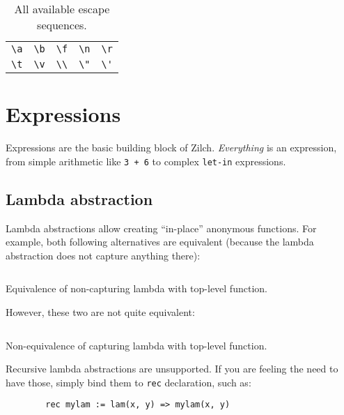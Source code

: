 \begin{table}[H]
	\begin{tabularx}{\textwidth}{*{5}{Y}}
		\toprule
		\verb|\a| & \verb|\b| & \verb|\f| & \verb|\n| & \verb|\r| \\
		\verb|\t| & \verb|\v| & \verb|\\| & \verb|\"| & \verb|\'| \\
		\bottomrule
	\end{tabularx}

	\caption{All available escape sequences.}
	\label{table:zilch-grammar-lexical-strings-escapesequences}
\end{table}

\section{Expressions}\label{sec:zilch-grammar-expressions}

Expressions are the basic building block of Zilch.
\textit{Everything} is an expression, from simple arithmetic like \texttt{3 + 6} to complex \texttt{let-in} expressions.

\subsection{Lambda abstraction}\label{subsec:zilch-grammar-expressions-lambda}

Lambda abstractions allow creating ``in-place'' anonymous functions.
For example, both following alternatives are equivalent (because the lambda abstraction does not capture anything there):
\begin{listing}[H]
	\inputminted{\zilchlexer}{examples/captureless-lambda-equivalence.zc}

	\captionsetup{style=invisible}
	\caption{Equivalence of non-capturing lambda with top-level function.}
\end{listing}
\vspace*{-\baselineskip}

\noindent However, these two are not quite equivalent:
\begin{listing}[H]
	\inputminted{\zilchlexer}{examples/closure-non-equivalence.zc}

	\captionsetup{style=invisible}
	\caption{Non-equivalence of capturing lambda with top-level function.}
\end{listing}
\vspace*{-\baselineskip}

\begin{infobox}
	Recursive lambda abstractions are unsupported.
	If you are feeling the need to have those, simply bind them to \texttt{rec} declaration, such as:
	\vspace*{\baselineskip}

	\begin{verbatim}
		rec mylam := lam(x, y) => mylam(x, y)
  \end{verbatim}
\end{infobox}

